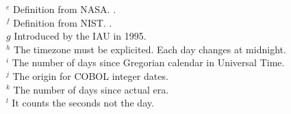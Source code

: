 \begin{table}
$^e$ Definition from NASA. \cite{Sch}. \\
$^f$ Definition from NIST. \cite{Nis}. \\
$g$ Introduced by the IAU in 1995. \\
$^h$ The timezone must be explicited. Each day changes at midnight. \\
$^i$ The number of days since Gregorian calendar in Universal Time. \\
$^j$ The origin for COBOL integer dates. \\
$^k$  The number of days since actual era. \\
$^l$  It counts the seconds not the day. \\
\end{table}


%

